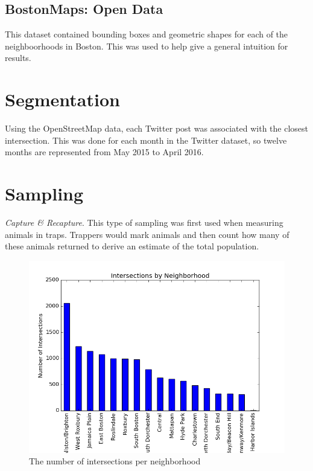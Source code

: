 \documentclass[twocolumn,10pt]{asme2ej}
\begin{document}
\subsection{BostonMaps: Open Data}
This dataset contained bounding boxes and geometric shapes for each of the neighboorhoods in Boston. This was used to help give a general intuition for results.
\section{Segmentation}
Using the OpenStreetMap data, each Twitter post was associated with the closest intersection. This was done for each month in the Twitter dataset, so twelve months are represented from May 2015 to April 2016.
\section{Sampling}
\textit{Capture \& Recapture}. This type of sampling was first used when measuring animals in traps. Trappers would mark animals and then count how many of these animals returned to derive an estimate of the total population.
\begin{figure} 
\includegraphics[scale=0.4]{numberofintersections.png}
\caption{The number of intersections per neighborhood}
\end{figure}
\end{document}
